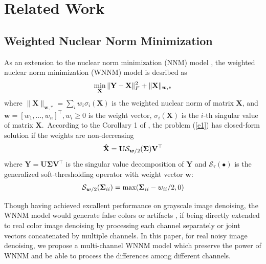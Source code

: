 \documentclass[10pt,twocolumn,letterpaper,sort&compress]{article}
\begin{document}
\section{Related Work}

\subsection{Weighted Nuclear Norm Minimization}
As an extension to the nuclear norm minimization (NNM) model \cite{cai2010singular}, the weighted nuclear norm minimization (WNNM) model \cite{wnnm} is desribed as 
\vspace{-3mm}
\begin{equation}
\label{e1}
\vspace{-3mm}
\min_{\mathbf{X}}\|\mathbf{Y}-\mathbf{X}\|_{F}^{2}
+
\|\mathbf{X}\|_{\bm{w},*}
\end{equation}
where $\|\mathbf{X}\|_{\bm{w},*}=\sum_{i}w_{i}\sigma_{i}(\mathbf{X})$ is the weighted nuclear norm of matrix $\mathbf{X}$, and $\bm{w}=[w_{1},...,w_{n}]^{\top}, w_{i}\ge 0$ is the weight vector, $\sigma_{i}(\mathbf{X})$ is the $i$-th singular value of matrix $\mathbf{X}$.\ According to the Corollary 1 of \cite{wnnmijcv}, the problem (\ref{e1}) has closed-form solution if the weights are non-decreasing
\vspace{-3mm}  
\begin{equation}
\label{e2}
\vspace{-3mm}
\mathbf{\hat{X}}
=
\mathbf{U}
\mathcal{S}_{\bm{w}/2}
(\mathbf{\Sigma})
\mathbf{V}^{\top}
\end{equation}
where $\mathbf{Y}=\mathbf{U}\mathbf{\Sigma}\mathbf{V}^{\top}$ is the singular value decomposition \cite{eckart1936approximation} of $\mathbf{Y}$ and 
$\mathcal{S}_{\tau}(\bullet)$ is the generalized soft-thresholding operator with weight vector $\bm{w}$:
\vspace{-3mm}
\begin{equation}
\label{e3}
\vspace{-3mm}
\mathcal{S}_{\bm{w}/2}
(\mathbf{\Sigma}_{ii})
=
\max(\mathbf{\Sigma}_{ii}-w_{ii}/2, 0)
\end{equation}

Though having achieved excallent performance on grayscale image denoising, the WNNM model would generate false colors or artifacts \cite{mairal2008sparse}, if being directly extended to real color image denoising by processing each channel separately or joint vectors concatenated by multiple channels. In this paper, for real noisy image denoising, we propose a multi-channel WNNM model which preserve the power of WNNM and be able to process the differences among different channels.
\end{document}
